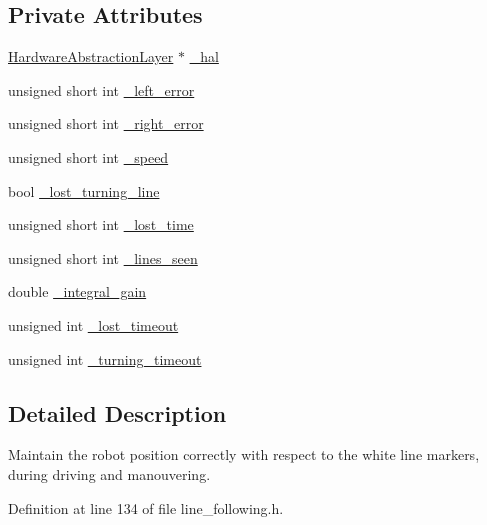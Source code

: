 \subsection*{Private Attributes}
\begin{DoxyCompactItemize}
\item 
\hyperlink{classIDP_1_1HardwareAbstractionLayer}{HardwareAbstractionLayer} $\ast$ \hyperlink{classIDP_1_1LineFollowing_a9adfbcd956e7d6373f28ea60073c92fa}{\_\-hal}
\item 
unsigned short int \hyperlink{classIDP_1_1LineFollowing_a73eb5dbd030d04809ffe8bf08956517d}{\_\-left\_\-error}
\item 
unsigned short int \hyperlink{classIDP_1_1LineFollowing_ac74d1f91775296a217ff1aa4ecf00ae9}{\_\-right\_\-error}
\item 
unsigned short int \hyperlink{classIDP_1_1LineFollowing_a67d4ac53d4cd8fa53d6b61ec839ce8bc}{\_\-speed}
\item 
bool \hyperlink{classIDP_1_1LineFollowing_a76fe578bf4bbd847e74bb1b9bfab7149}{\_\-lost\_\-turning\_\-line}
\item 
unsigned short int \hyperlink{classIDP_1_1LineFollowing_acc5f7d1d33c49ae1be9de702122aac02}{\_\-lost\_\-time}
\item 
unsigned short int \hyperlink{classIDP_1_1LineFollowing_a21b74d0156ada50603330cc70b17e072}{\_\-lines\_\-seen}
\item 
double \hyperlink{classIDP_1_1LineFollowing_ac5bcda6c1e88072fbe3868e3135fda27}{\_\-integral\_\-gain}
\item 
unsigned int \hyperlink{classIDP_1_1LineFollowing_a93b2293cd1f5fe2795b0cca37b38f403}{\_\-lost\_\-timeout}
\item 
unsigned int \hyperlink{classIDP_1_1LineFollowing_a2b929e24688cbc116b1f95b295cbc914}{\_\-turning\_\-timeout}
\end{DoxyCompactItemize}


\subsection{Detailed Description}
Maintain the robot position correctly with respect to the white line markers, during driving and manouvering. 

Definition at line 134 of file line\_\-following.h.



